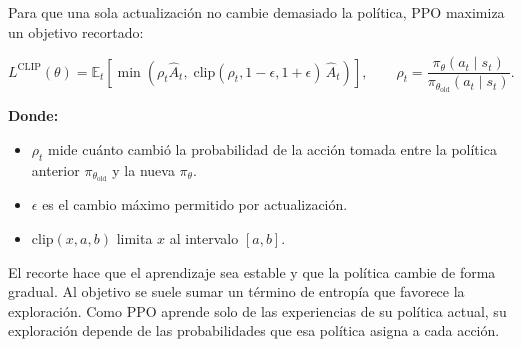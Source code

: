 Para que una sola actualización no cambie demasiado la política, PPO maximiza un objetivo
recortado:

\begin{equation}
    L^{\text{CLIP}}(\theta) = \mathbb{E}_t\!\left[
    \min\!\left(\rho_t \hat{A}_t,\;
    \text{clip}(\rho_t, 1-\epsilon, 1+\epsilon)\,\hat{A}_t\right)\right],
    \qquad
    \rho_t = \frac{\pi_\theta(a_t \mid s_t)}{\pi_{\theta_{\text{old}}}(a_t \mid s_t)}.
    \label{eq:ppo_clip}
\end{equation}

\noindent\textbf{Donde:}
\begin{itemize}
    \item $\rho_t$ mide cuánto cambió la probabilidad de la acción tomada entre la política anterior $\pi_{\theta_{\text{old}}}$ y la nueva $\pi_\theta$.
    \item $\epsilon$ es el cambio máximo permitido por actualización.
    \item $\text{clip}(x, a, b)$ limita $x$ al intervalo $[a, b]$.
\end{itemize}

El recorte hace que el aprendizaje sea estable y que la política cambie de forma gradual. Al
objetivo se suele sumar un término de entropía que favorece la exploración. Como PPO
aprende solo de las experiencias de su política actual, su exploración depende de las
probabilidades que esa política asigna a cada acción.
